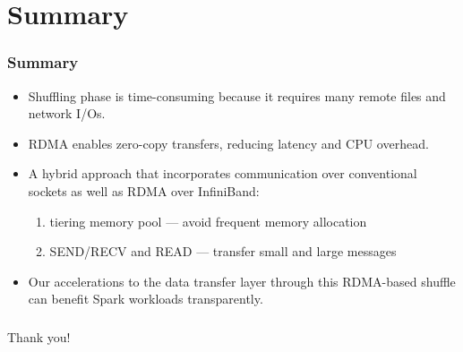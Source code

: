 \documentclass{beamer}
\begin{document}
\section{Summary}

\begin{frame}
  \frametitle{Summary}
  \begin{itemize}
  \item Shuffling phase is time-consuming because it requires many remote files
    and network I/Os.
  \item RDMA enables zero-copy transfers, reducing latency and CPU overhead.
  \item A hybrid approach that incorporates communication over conventional
    sockets as well as RDMA over InfiniBand:
    \begin{enumerate}
    \item tiering memory pool --- avoid frequent memory allocation
    \item SEND/RECV and READ --- transfer small and large messages
    \end{enumerate}
  \item Our accelerations to the data transfer layer through this
    RDMA-based shuffle can benefit Spark workloads transparently.
  \end{itemize}
\end{frame}

\begin{frame}[plain]
  \frametitle{}
  {
    \LARGE{
      \bfseries
      \begin{center}
        Thank you!
      \end{center}
    }
  }
\end{frame}
\end{document}
